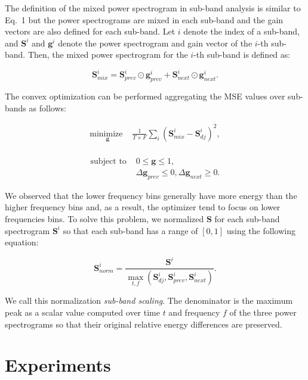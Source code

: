 \documentclass[sigconf]{nimeart}
\begin{document}
The definition of the mixed power spectrogram in sub-band analysis is similar to Eq.~1 but the power spectrograms are mixed in each sub-band and the gain vectors are also defined for each sub-band. Let $i$ denote the index of a sub-band, and $\bm{S}^i$ and $\bm{g}^i$ denote the power spectrogram and gain vector of the $i$-th sub-band. Then, the mixed power spectrogram for the $i$-th sub-band is defined as:


\begin{equation}\bm{S}_{mix}^i = \bm{S}_{prev}^i \odot \bm{g}_{prev}^i + \bm{S}_{next}^i \odot \bm{g}_{next}^i.\end{equation}


The convex optimization can be performed aggregating the MSE values over sub-bands as follows:


\begin{equation}\begin{aligned}
\underset{\bm{g}}{\text{minimize }} &\frac{1}{T \times F}\sum_i (\bm{S}_{mix}^i - \bm{S}_{dj}^i)^2, \\[5pt]
\end{aligned}\end{equation}

\begin{equation}\begin{aligned}
\text{subject to }
& 0 \leq \bm{g} \leq 1, \\
& \Delta \bm{g}_{prev} \leq 0, \Delta \bm{g}_{next} \geq 0.\end{aligned}\end{equation}


We observed that the lower frequency bins generally have more energy than the higher frequency bins and, as a result, the optimizer tend to focus on lower frequencies bins. To solve this problem, we normalized $\bm{S}$ for each sub-band spectrogram $\bm{S}^i$ so that each sub-band has a range of $[0, 1]$ using the following equation:


\begin{equation}\bm{S}_{norm}^i =\frac{\bm{S}^i}{\max_{t,f}(\bm{S}_{dj}^i, \bm{S}_{prev}^i, \bm{S}_{next}^i)}.\end{equation}


We call this normalization \emph{sub-band scaling}. The denominator is the maximum peak as a scalar value computed over time $t$ and frequency $f$ of the three power spectrograms so that their original relative energy differences are preserved.

\section{Experiments}\label{experiments}
\end{document}
